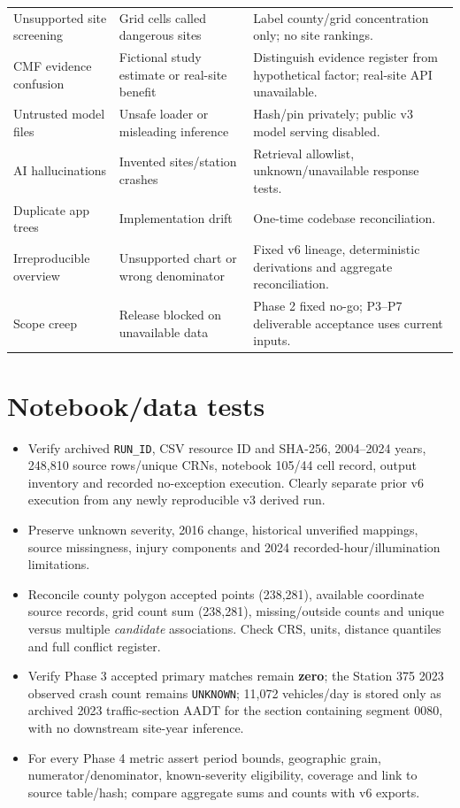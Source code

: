 \documentclass[11pt,a4paper,openany]{report}
\newcommand{\pathcode}[1]{\nolinkurl{#1}}
\begin{document}
\begin{longtable}{@{}L{33mm}L{50mm}L{59mm}@{}}
Unsupported site screening & Grid cells called dangerous sites & Label county/grid concentration only; no site rankings.\\
CMF evidence confusion & Fictional study estimate or real-site benefit & Distinguish evidence register from hypothetical factor; real-site API unavailable.\\
Untrusted model files & Unsafe loader or misleading inference & Hash/pin privately; public v3 model serving disabled.\\
AI hallucinations & Invented sites/station crashes & Retrieval allowlist, unknown/unavailable response tests.\\
Duplicate app trees & Implementation drift & One-time codebase reconciliation.\\
Irreproducible overview & Unsupported chart or wrong denominator & Fixed v6 lineage, deterministic derivations and aggregate reconciliation.\\
Scope creep & Release blocked on unavailable data & Phase 2 fixed no-go; P3--P7 deliverable acceptance uses current inputs.\\
\bottomrule\end{longtable}
\normalsize

\section{Notebook/data tests}
\begin{itemize}
\item Verify archived \pathcode{RUN_ID}, CSV resource ID and SHA-256, 2004--2024 years, 248,810 source rows/unique CRNs, notebook 105/44 cell record, output inventory and recorded no-exception execution. Clearly separate prior v6 execution from any newly reproducible v3 derived run.
\item Preserve unknown severity, 2016 change, historical unverified mappings, source missingness, injury components and 2024 recorded-hour/illumination limitations.
\item Reconcile county polygon accepted points (238,281), available coordinate source records, grid count sum (238,281), missing/outside counts and unique versus multiple \emph{candidate} associations. Check CRS, units, distance quantiles and full conflict register.
\item Verify Phase 3 accepted primary matches remain \textbf{zero}; the Station 375 2023 observed crash count remains \pathcode{UNKNOWN}; 11,072 vehicles/day is stored only as archived 2023 traffic-section AADT for the section containing segment 0080, with no downstream site-year inference.
\item For every Phase 4 metric assert period bounds, geographic grain, numerator/denominator, known-severity eligibility, coverage and link to source table/hash; compare aggregate sums and counts with v6 exports.
\end{itemize}
\end{document}
